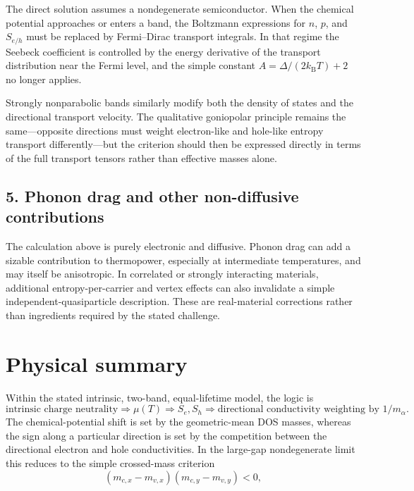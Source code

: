 \documentclass[11pt]{article}
\newcommand{\kb}{k_{\mathrm B}}
\begin{document}
The direct solution assumes a nondegenerate semiconductor. When the chemical potential approaches or enters a band, the Boltzmann expressions for $n$, $p$, and $S_{e/h}$ must be replaced by Fermi--Dirac transport integrals. In that regime the Seebeck coefficient is controlled by the energy derivative of the transport distribution near the Fermi level, and the simple constant $A=\Delta/(2\kb T)+2$ no longer applies.

Strongly nonparabolic bands similarly modify both the density of states and the directional transport velocity. The qualitative goniopolar principle remains the same---opposite directions must weight electron-like and hole-like entropy transport differently---but the criterion should then be expressed directly in terms of the full transport tensors rather than effective masses alone.

\subsection*{5. Phonon drag and other non-diffusive contributions}

The calculation above is purely electronic and diffusive. Phonon drag can add a sizable contribution to thermopower, especially at intermediate temperatures, and may itself be anisotropic. In correlated or strongly interacting materials, additional entropy-per-carrier and vertex effects can also invalidate a simple independent-quasiparticle description. These are real-material corrections rather than ingredients required by the stated challenge.

\section*{Physical summary}

Within the stated intrinsic, two-band, equal-lifetime model, the logic is
\begin{equation}
\boxed{
\text{intrinsic charge neutrality}
\Rightarrow \mu(T)
\Rightarrow S_e,S_h
\Rightarrow
\text{directional conductivity weighting by }1/m_{\alpha}.
}
\end{equation}
The chemical-potential shift is set by the geometric-mean DOS masses, whereas the sign along a particular direction is set by the competition between the directional electron and hole conductivities. In the large-gap nondegenerate limit this reduces to the simple crossed-mass criterion
\begin{equation}
\boxed{
(m_{c,x}-m_{v,x})(m_{c,y}-m_{v,y})<0,
}
\end{equation}
\end{document}
